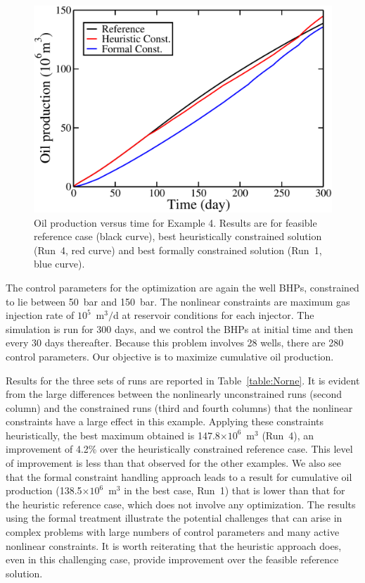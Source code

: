 \documentclass[twocolumn,numbook]{svjour3}          %
\begin{document}
\begin{figure} [ht]
\begin{center}
\includegraphics[totalheight=2.18in,angle=0]{NorneRevenue.pdf}
\end{center}
\caption{Oil production versus time for Example 4. Results are for
  feasible reference case (black curve), best heuristically constrained solution (Run~4, red curve)
  and best formally constrained solution (Run~1, blue curve).}
\label{fig:NorneRevenue}
\end{figure}



The control parameters for the optimization are again the well BHPs, constrained
to lie between 50~bar and 150~bar. The nonlinear constraints are maximum gas
injection rate of $10^5$~m$^3/$d at reservoir conditions for each injector. The
simulation is run for 300 days, and we control the BHPs at initial time and then
every 30 days thereafter. Because this problem involves 28 wells, there are 280
control parameters. Our objective is to maximize cumulative oil production.

Results for the three sets of runs are reported in Table~\ref{table:Norne}. It
is evident from the large differences between the nonlinearly unconstrained runs
(second column) and the constrained runs (third and fourth columns) that the
nonlinear constraints have a large effect in this example. Applying these constraints heuristically, the best maximum obtained is
147.8$\times 10^6$~m$^3$ (Run~4), an improvement of 4.2\% over the heuristically constrained
reference case. This level of improvement is less than that observed for the
other examples. We also see that the formal constraint handling approach leads
to a result for cumulative oil production (138.5$\times 10^6$~m$^3$ in the best case, Run~1)
that is lower than that for the heuristic reference case, which does
not involve any optimization. The results using the formal treatment illustrate the potential challenges that can
arise in complex problems with large numbers of control parameters and many active nonlinear
constraints. It is worth reiterating that the heuristic approach does, even in
this challenging case, provide improvement over the feasible reference solution.
\end{document}
